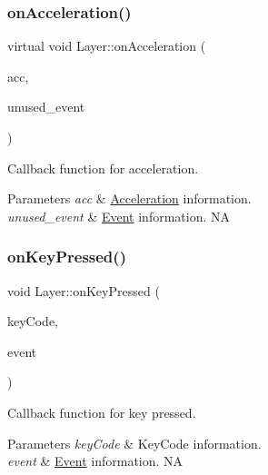 \subsubsection{\texorpdfstring{on\+Acceleration()}{onAcceleration()}\hspace{0.1cm}{\footnotesize\ttfamily [2/2]}}
{\footnotesize\ttfamily virtual void Layer\+::on\+Acceleration (\begin{DoxyParamCaption}\item[{\hyperlink{classAcceleration}{Acceleration} $\ast$}]{acc,  }\item[{\hyperlink{classEvent}{Event} $\ast$}]{unused\+\_\+event }\end{DoxyParamCaption})\hspace{0.3cm}{\ttfamily [virtual]}}

Callback function for acceleration. 
\begin{DoxyParams}{Parameters}
{\em acc} & \hyperlink{classAcceleration}{Acceleration} information. \\
\hline
{\em unused\+\_\+event} & \hyperlink{classEvent}{Event} information.  NA \\
\hline
\end{DoxyParams}
\mbox{\label{classLayer_aa92de73700bdffa7e30a37cac4ea6e98}} 
\subsubsection{\texorpdfstring{on\+Key\+Pressed()}{onKeyPressed()}\hspace{0.1cm}{\footnotesize\ttfamily [1/2]}}
{\footnotesize\ttfamily void Layer\+::on\+Key\+Pressed (\begin{DoxyParamCaption}\item[{\hyperlink{classEventKeyboard_a7cd3fa46515673276ce8ec7f0e051606}{Event\+Keyboard\+::\+Key\+Code}}]{key\+Code,  }\item[{\hyperlink{classEvent}{Event} $\ast$}]{event }\end{DoxyParamCaption})\hspace{0.3cm}{\ttfamily [virtual]}}

Callback function for key pressed. 
\begin{DoxyParams}{Parameters}
{\em key\+Code} & Key\+Code information. \\
\hline
{\em event} & \hyperlink{classEvent}{Event} information.  NA \\
\hline
\end{DoxyParams}
\mbox{\label{classLayer_ab45df2e3f40c128c11da1a92826ceef1}} 
